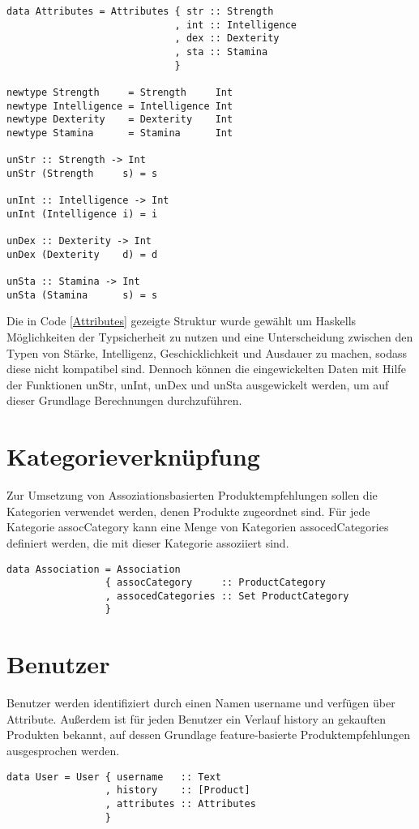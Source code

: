 \begin{lstlisting}[label=Attributes,caption=Struktur von \textsf{Attributes} und zugehörige Zugriffsfunktionen]
data Attributes = Attributes { str :: Strength
                             , int :: Intelligence
                             , dex :: Dexterity
                             , sta :: Stamina
                             }

newtype Strength     = Strength     Int
newtype Intelligence = Intelligence Int
newtype Dexterity    = Dexterity    Int
newtype Stamina      = Stamina      Int

unStr :: Strength -> Int
unStr (Strength     s) = s

unInt :: Intelligence -> Int
unInt (Intelligence i) = i

unDex :: Dexterity -> Int
unDex (Dexterity    d) = d

unSta :: Stamina -> Int
unSta (Stamina      s) = s
\end{lstlisting}
Die in Code \ref{Attributes} gezeigte Struktur wurde gewählt um Haskells Möglichkeiten der Typsicherheit zu nutzen und eine Unterscheidung zwischen den Typen von Stärke, Intelligenz, Geschicklichkeit und Ausdauer zu machen, sodass diese nicht kompatibel sind. Dennoch können die eingewickelten Daten mit Hilfe der Funktionen \textsf{unStr}, \textsf{unInt}, \textsf{unDex} und \textsf{unSta} ausgewickelt werden, um auf dieser Grundlage Berechnungen durchzuführen.


\section{Kategorieverknüpfung}
Zur Umsetzung von Assoziationsbasierten Produktempfehlungen sollen die Kategorien verwendet werden, denen Produkte zugeordnet sind. Für jede Kategorie \textsf{assocCategory} kann eine Menge von Kategorien \textsf{assocedCategories} definiert werden, die mit dieser Kategorie assoziiert sind.

\begin{lstlisting}[label=Association,caption=Struktur von \textsf{Association}]
data Association = Association
                 { assocCategory     :: ProductCategory
                 , assocedCategories :: Set ProductCategory
                 }
\end{lstlisting}


\section{Benutzer}
Benutzer werden identifiziert durch einen Namen \textsf{username} und verfügen über Attribute. Außerdem ist für jeden Benutzer ein Verlauf \textsf{history} an gekauften Produkten bekannt, auf dessen Grundlage feature-basierte Produktempfehlungen ausgesprochen werden.
\begin{lstlisting}[label=User,caption=Struktur vom \textsf{User}]
data User = User { username   :: Text
                 , history    :: [Product]
                 , attributes :: Attributes
                 }
\end{lstlisting}